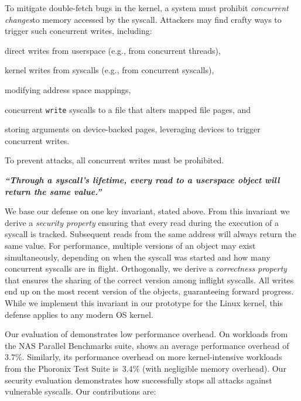 To mitigate double-fetch bugs in the kernel, a system must prohibit
\emph{concurrent changes}\footnotemark to memory accessed by the syscall. Attackers may
find crafty ways to trigger such concurrent writes, including:
\begin{inparaenum}
\item  direct writes from userspace (e.g., from concurrent threads),
\item  kernel writes from syscalls (e.g., from concurrent syscalls),
\item  modifying address space mappings,
\item  concurrent \texttt{write} syscalls to a file that alters mapped
file pages, and
\item  storing arguments on device-backed pages, leveraging devices to trigger
concurrent writes.
\end{inparaenum}
To prevent attacks, all concurrent writes must be prohibited.

\begin{center}
  \textbf{\emph{``Through a syscall's lifetime, every read to a userspace object
  will return the same value.''}}
\end{center}
We base our defense on one key invariant, stated above. 
From this invariant we derive a \emph{security
property} ensuring that every read during the execution of a syscall is
tracked. Subsequent reads from the same address will always return the same value.
For performance, multiple versions of an object may exist simultaneously,
depending on when the syscall was started and how many
concurrent syscalls are in flight. 
Orthogonally, we derive a \emph{correctness
property} that ensures the sharing of the correct version among inflight
syscalls. 
All writes end up on the most recent version of the objects, 
guaranteeing forward progress.
While we implement this invariant in our \midas prototype for the Linux kernel,
this defense applies to any modern OS kernel.

Our evaluation of \midas demonstrates low performance overhead.
On workloads from the NAS Parallel Benchmarks suite, \midas shows
an average performance overhead of~$3.7\%$. Similarly, its performance overhead on
more kernel-intensive workloads from the Phoronix Test Suite is~$3.4\%$ (with
negligible memory overhead).
%
Our security evaluation demonstrates how \midas successfully stops all attacks
against vulnerable syscalls.
%
Our contributions are:

